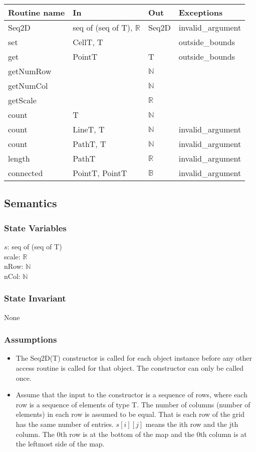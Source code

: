 \documentclass[12pt]{article}
\begin{document}
\begin{tabular}{| l | l | l | p{5cm} |}
\hline
\textbf{Routine name} & \textbf{In} & \textbf{Out} & \textbf{Exceptions}\\
\hline
Seq2D & seq of (seq of T), $\mathbb{R}$ & Seq2D & invalid\_argument\\
\hline
set & CellT, T & ~ & outside\_bounds\\
\hline
get & PointT & T & outside\_bounds\\
\hline
getNumRow & ~ & $\mathbb{N}$ & \\
\hline
getNumCol & ~ & $\mathbb{N}$ & \\
\hline
getScale & ~ & $\mathbb{R}$ & \\
\hline
count & T & $\mathbb{N}$ & \\
\hline
count & LineT, T & $\mathbb{N}$ & invalid\_argument\\
\hline
count & PathT, T & $\mathbb{N}$ & invalid\_argument\\
\hline
length & PathT & $\mathbb{R}$ & invalid\_argument\\
\hline
connected & PointT, PointT & $\mathbb{B}$ & invalid\_argument\\
\hline
\end{tabular}
\subsection* {Semantics}

\subsubsection* {State Variables}

$s$: seq of (seq of T)\\
scale: $\mathbb{R}$\\
nRow: $\mathbb{N}$\\
nCol: $\mathbb{N}$

\subsubsection* {State Invariant}

None

\subsubsection* {Assumptions}

\begin{itemize}
\item The Seq2D(T) constructor is called for each object instance before any
other access routine is called for that object.  The constructor can only be
called once.
\item Assume that the input to the constructor is a sequence of rows, where each
  row is a sequence of elements of type T.  The number of columns (number of
  elements) in each row is assumed to be equal. That is each row
  of the grid has the same number of entries.  $s[i][j]$ means the ith row and
  the jth column.  The 0th row is at the bottom of the map and the 0th column
  is at the leftmost side of the map.
\end{itemize}
\end{document}
